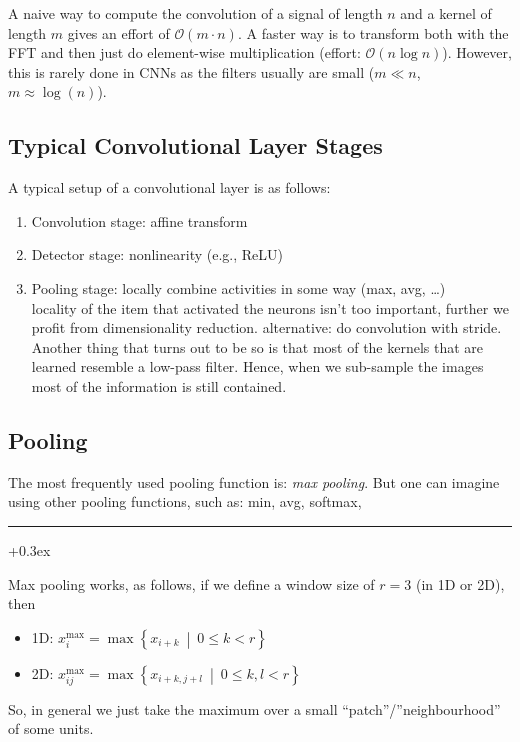 \documentclass[a2paper,8pt]{extarticle}
\newcommand{\BigO}{\mathcal{O}}
\newcommand{\dset}[2]{\left\{ #1 \ \middle| \ #2 \right\}}
\newcommand{\customboxpaddingsize}{0pt}
\newcommand{\emptyarg}[1][]{\ifthenelse{\isempty{#1}}{}{\ (#1)}}
\newcommand{\Def}[1][]{{\setlength\fboxsep{\customboxpaddingsize}
\colorbox{defcolor}{%
\color{custtitlecolor}{\textbf{D.\emptyarg[#1]}}}\kern+0.3ex}}
\newcommand{\sep}{\vspace{0pt}\noindent\hrule\vspace{0pt}}
\newcommand{\sep}{\vspace{5pt}\noindent\hrule\vspace{5pt}}
\begin{document}
\begin{landscape}
\begin{multicols*}{7}
A naive way to compute the convolution of a signal of length $n$ and a kernel of
length $m$ gives an effort of $\BigO(m\cdot n)$. A faster way is to transform
both with the FFT and then just do element-wise multiplication (effort:
$\BigO(n\log n)$). However, this is rarely done in CNNs as the filters usually
are small ($m\ll n$, $m\approx \log(n)$).

\subsection{Typical Convolutional Layer Stages}

A typical setup of a convolutional layer is as follows:

\begin{enumerate}
  \item Convolution stage: affine transform
  \item Detector stage: nonlinearity (e.g., ReLU)
  \item Pooling stage: locally combine activities in some way (max, avg,
  \ldots)\\
  locality of the item that activated the neurons isn't too important, further
  we profit from dimensionality reduction. alternative: do convolution with
  stride. Another thing that turns out to be so is that most of the kernels that are
learned resemble a low-pass filter. Hence, when we sub-sample the images most of
the information is still contained.
\end{enumerate}

\subsection{Pooling}

The most frequently used pooling function is: \emph{max pooling}. But one
can imagine using other pooling functions, such as: min, avg, softmax,

\sep

\Def[Max-Pooling] 

Max pooling works, as follows, if we define a window size of $r=3$ (in 1D or
2D), then
\begin{itemize}
  \item 1D: $x_i^{\max}=\max \dset{x_{i+k}}{0\leq k < r}$
  \item 2D: $x_{ij}^{\max}=\max \dset{x_{i+k,j+l}}{0\leq k,l < r}$
\end{itemize}
So, in general we just take the maximum over a small ``patch''/''neighbourhood''
of some units.


\end{multicols*}
\end{landscape}
\end{document}
